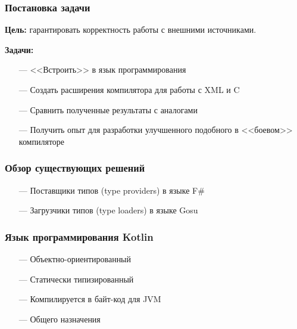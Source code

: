 \documentclass[12pt]{beamer}
\begin{document}
\begin{frame}\frametitle{Постановка задачи}

    \textbf{Цель:} гарантировать корректность работы с внешними источниками.

    \textbf{Задачи:}
    \begin{itemize}
        \item[---] {<<Встроить>>} в язык программирования
        \item[---] Создать расширения компилятора для работы с XML и C
        \item[---] Сравнить полученные результаты с аналогами
        \item[---] Получить опыт для разработки улучшенного подобного в {<<боевом>>} компиляторе
    \end{itemize}



\end{frame}

\begin{frame}\frametitle{Обзор существующих решений} %
    \begin{itemize}
        \item[---] Поставщики типов (type providers) в языке F\#
        \item[---] Загрузчики типов (type loaders) в языке Gosu
    \end{itemize}
\end{frame}

\begin{frame}\frametitle{Язык программирования Kotlin}
    \begin{itemize}
        \item[---] Объектно-ориентированный
        \item[---] Статически типизированный
        \item[---] Компилируется в байт-код для JVM
        \item[---] Общего назначения
    \end{itemize}
\end{frame}
\end{document}
